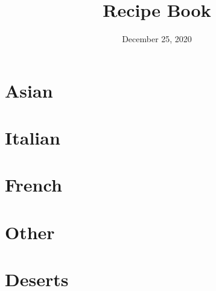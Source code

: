\documentclass[a4paper,12pt]{book}
\title{Recipe Book}
\author{}
\date{December 25, 2020}
\newcommand{\invisiblechapter}[1]{%
  \refstepcounter{chapter}%
  \addcontentsline{toc}{chapter}{\protect\numberline{\thechapter}#1}%
  \chaptermark{#1}}
\begin{document}
\maketitle
\tableofcontents
\chapter{Asian}
%




\chapter{Italian}









\chapter{French}




\chapter{Other}







\chapter{Deserts}











\end{document}
